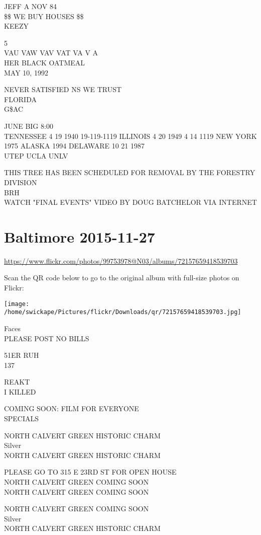 \documentclass[10pt,letterpaper]{article}
\begin{document}
JEFF A NOV 84\\
\$\$ WE BUY HOUSES \$\$\\
KEEZY

5\\
VAU VAW VAV VAT VA V A\\
HER BLACK OATMEAL\\
MAY 10, 1992

NEVER SATISFIED NS WE TRUST\\
FLORIDA\\
G\$AC

JUNE BIG 8:00\\
TENNESSEE 4 19 1940 19{-}119{-}1119 ILLINOIS 4 20 1949 4 14 1119 NEW YORK 1975 ALASKA 1994 DELAWARE 10 21 1987\\
UTEP UCLA UNLV

THIS TREE HAS BEEN SCHEDULED FOR REMOVAL BY THE FORESTRY DIVISION\\
BRH\\
WATCH "FINAL EVENTS" VIDEO BY DOUG BATCHELOR VIA INTERNET
\pagebreak

\section*{Baltimore 2015-11-27}

\url{https://www.flickr.com/photos/99753978@N03/albums/72157659418539703}

Scan the QR code below to go to the original album with full-size photos on Flickr:

\texttt{[image: /home/swickape/Pictures/flickr/Downloads/qr/72157659418539703.jpg]}
\pagebreak

Faces\\
PLEASE POST NO BILLS

51ER RUH\\
137

REAKT\\
I KILLED

COMING SOON: FILM FOR EVERYONE\\
SPECIALS

NORTH CALVERT GREEN HISTORIC CHARM\\
Silver\\
NORTH CALVERT GREEN HISTORIC CHARM

PLEASE GO TO 315 E 23RD ST FOR OPEN HOUSE\\
NORTH CALVERT GREEN COMING SOON\\
NORTH CALVERT GREEN COMING SOON

NORTH CALVERT GREEN COMING SOON\\
Silver\\
NORTH CALVERT GREEN HISTORIC CHARM
\end{document}
